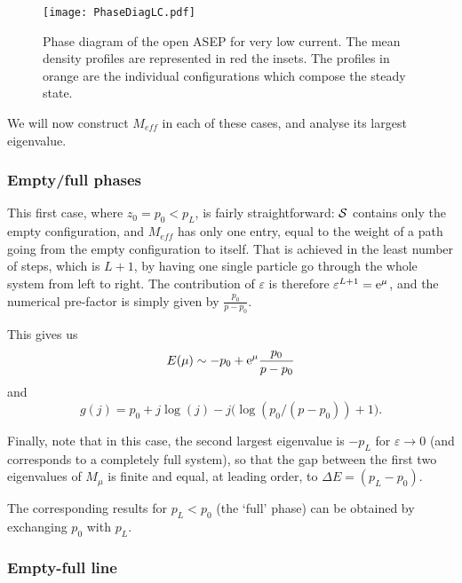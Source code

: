 \documentclass[aps,pre,onecolumn,showpacs,showkeys,a4paper]{revtex4-1}
\begin{document}
 \begin{figure}[ht]
\begin{center}
 \texttt{[image: PhaseDiagLC.pdf]}
  \caption{Phase diagram of the open ASEP for very low current. The mean density profiles are represented in red the insets. The profiles in orange are the individual configurations which compose the steady state.}
\label{fig-DiagLC}
 \end{center}
 \end{figure}

We will now construct $M_{eff}$ in each of these cases, and analyse its largest eigenvalue.

\subsubsection{Empty/full phases}
\label{IV-1-a}

This first case, where $z_0=p_0 <p_L$, is fairly straightforward: ${\cal S}$ contains only the empty configuration, and $M_{eff}$ has only one entry, equal to the weight of a path going from the empty configuration to itself. That is achieved in the least number of steps, which is $L+1$, by having one single particle go through the whole system from left to right. The contribution of $\varepsilon$ is therefore $\varepsilon^{L+1}={\rm e}^{\mu}$, and the numerical pre-factor is simply given by $\frac{p_0}{p-p_0}$.

This gives us
\begin{equation}\label{IV-3-EmuLD}
E(\mu)\sim -p_0+{\rm e}^{\mu}\frac{p_0}{p-p_0}
\end{equation}
and
\begin{equation}\label{IV-3-gjLD}\boxed{
g(j)=p_0+j\log(j)-j\bigl(\log(p_0/(p-p_0))+1\bigr).
}\end{equation}


Finally, note that in this case, the second largest eigenvalue is $-p_L$ for $\varepsilon\rightarrow 0$ (and corresponds to a completely full system), so that the gap between the first two eigenvalues of $M_\mu$ is finite and equal, at leading order, to $\Delta E=(p_L-p_0)$. 

The corresponding results for $p_L<p_0$ (the `full' phase) can be obtained by exchanging $p_0$ with $p_L$.


\subsubsection{Empty-full line}
\label{IV-1-b}
\end{document}
